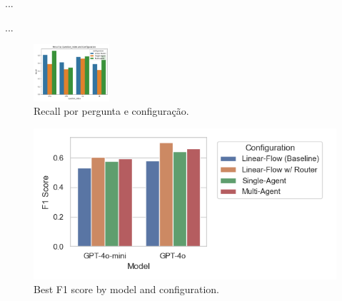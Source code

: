                 ...

                ...
                
                \begin{figure}[h!]
                    \centering              
                    \includegraphics[width=0.25\textwidth]{images_part_2/question_recall_question_index_configuration.png}
                    \caption{Recall por pergunta e configuração.}
                    \label{fig:question_recall_question_index_configuration}
                \end{figure}

            


                \begin{figure}[H]
                    \centering
                    \includegraphics[scale=0.75]{images_exp2/bar_best_f1_by_model_and_configuration.png}
                    \caption{Best F1 score by model and configuration.}
                    \label{fig:bar_best_f1_by_model_and_configuration}
                \end{figure}

